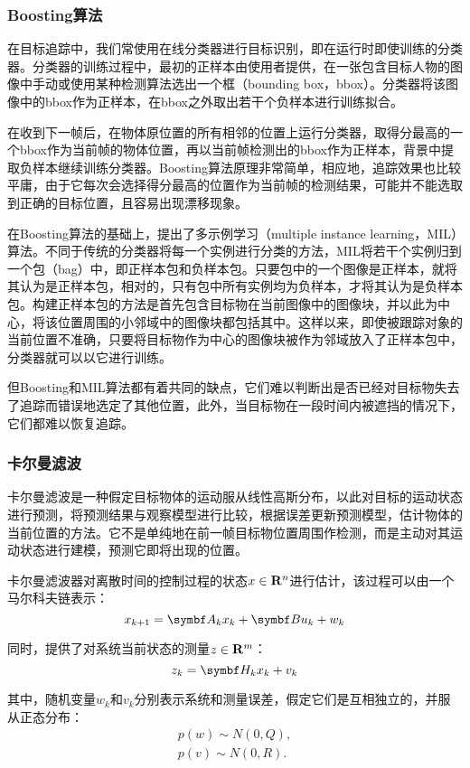 \subsubsection{Boosting算法}
  在目标追踪中，我们常使用在线分类器进行目标识别，即在运行时即使训练的分类器。分类器的训练过程中，最初的正样本由使用者提供，在一张包含目标人物的图像中手动或使用某种检测算法选出一个框（bounding box，bbox）。分类器将该图像中的bbox作为正样本，在bbox之外取出若干个负样本进行训练拟合。

  在收到下一帧后，在物体原位置的所有相邻的位置上运行分类器，取得分最高的一个bbox作为当前帧的物体位置，再以当前帧检测出的bbox作为正样本，背景中提取负样本继续训练分类器。Boosting算法原理非常简单，相应地，追踪效果也比较平庸，由于它每次会选择得分最高的位置作为当前帧的检测结果，可能并不能选取到正确的目标位置，且容易出现漂移现象。

  在Boosting算法的基础上，\citet{babenko2009visual}提出了多示例学习（multiple instance learning，MIL）算法。不同于传统的分类器将每一个实例进行分类的方法，MIL将若干个实例归到一个包（bag）中，即正样本包和负样本包。只要包中的一个图像是正样本，就将其认为是正样本包，相对的，只有包中所有实例均为负样本，才将其认为是负样本包。构建正样本包的方法是首先包含目标物在当前图像中的图像块，并以此为中心，将该位置周围的小邻域中的图像块都包括其中。这样以来，即使被跟踪对象的当前位置不准确，只要将目标物作为中心的图像块被作为邻域放入了正样本包中，分类器就可以以它进行训练。

  但Boosting和MIL算法都有着共同的缺点，它们难以判断出是否已经对目标物失去了追踪而错误地选定了其他位置，此外，当目标物在一段时间内被遮挡的情况下，它们都难以恢复追踪。

\subsubsection{卡尔曼滤波}

  卡尔曼滤波是一种假定目标物体的运动服从线性高斯分布，以此对目标的运动状态进行预测，将预测结果与观察模型进行比较，根据误差更新预测模型，估计物体的当前位置的方法。它不是单纯地在前一帧目标物位置周围作检测，而是主动对其运动状态进行建模，预测它即将出现的位置\cite{welch1995introduction}。
  
  卡尔曼滤波器对离散时间的控制过程的状态$x\in \mathbf{R}^n$进行估计，该过程可以由一个马尔科夫链表示：
$$x_{k+1}=\mat{A}_k x_k + \mat{B} u_k + w_k$$

  同时，提供了对系统当前状态的测量$z\in \mathbf{R}^m$：
$$z_k=\mat{H}_k x_k + v_k$$

  其中，随机变量$w_k$和$v_k$分别表示系统和测量误差，假定它们是互相独立的，并服从正态分布：
\begin{gather*}
p(w)\sim N(0,Q),\\
p(v)\sim N(0,R).
\end{gather*}
  
